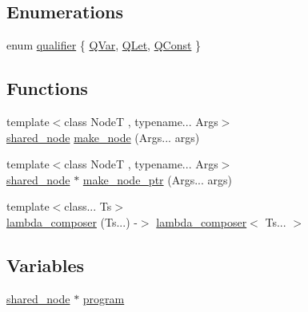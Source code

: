 \subsection*{Enumerations}
\begin{DoxyCompactItemize}
\item 
enum \hyperlink{namespacejawe_aeebd1dfc752b79ba7f0483883a839a1e}{qualifier} \{ \hyperlink{namespacejawe_aeebd1dfc752b79ba7f0483883a839a1ea3b2bd8bfd22454797fb807ab42c0b06e}{Q\+Var}, 
\hyperlink{namespacejawe_aeebd1dfc752b79ba7f0483883a839a1eac68e355be63af21b47503df4ac1cebb4}{Q\+Let}, 
\hyperlink{namespacejawe_aeebd1dfc752b79ba7f0483883a839a1eabc0bf4eb3c69232bfa9a835d804e0104}{Q\+Const}
 \}
\end{DoxyCompactItemize}
\subsection*{Functions}
\begin{DoxyCompactItemize}
\item 
{\footnotesize template$<$class NodeT , typename... Args$>$ }\\\hyperlink{namespacejawe_a3f307481d921b6cbb50cc8511fc2b544}{shared\+\_\+node} \hyperlink{namespacejawe_a0a97be2462d600042105436fe23cd584}{make\+\_\+node} (Args... args)
\item 
{\footnotesize template$<$class NodeT , typename... Args$>$ }\\\hyperlink{namespacejawe_a3f307481d921b6cbb50cc8511fc2b544}{shared\+\_\+node} $\ast$ \hyperlink{namespacejawe_add28adbc7f76f9876fe5792897346029}{make\+\_\+node\+\_\+ptr} (Args... args)
\item 
{\footnotesize template$<$class... Ts$>$ }\\\hyperlink{namespacejawe_af06095d386aabfc20a148ceff0d55ab7}{lambda\+\_\+composer} (Ts...) -\/$>$ \hyperlink{structjawe_1_1lambda__composer}{lambda\+\_\+composer}$<$ Ts... $>$
\end{DoxyCompactItemize}
\subsection*{Variables}
\begin{DoxyCompactItemize}
\item 
\hyperlink{namespacejawe_a3f307481d921b6cbb50cc8511fc2b544}{shared\+\_\+node} $\ast$ \hyperlink{namespacejawe_a234b0950c04caa89716a7592140fda5b}{program}
\end{DoxyCompactItemize}


